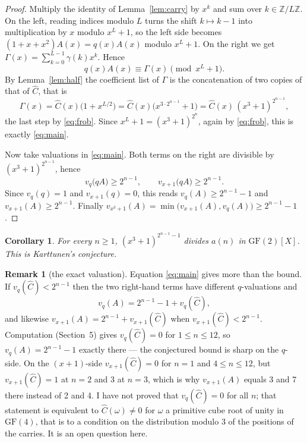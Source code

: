 \documentclass[11pt,a4paper]{article}
\theoremstyle{plain}
\newtheorem{corollary}[theorem]{Corollary}
\theoremstyle{definition}
\newtheorem*{remark}{Remark}
\newcommand{\Chat}{\widehat{C}}
\begin{document}
\begin{proof}
Multiply the identity of Lemma~\ref{lem:carry} by $x^{k}$ and sum over
$k\in\mathbb{Z}/L\mathbb{Z}$. On the left, reading indices modulo $L$ turns the shift
$k\mapsto k-1$ into multiplication by $x$ modulo $x^{L}+1$, so the left side becomes
$(1+x+x^{2})A(x)=q(x)A(x)$ modulo $x^{L}+1$. On the right we get
$\Gamma(x)=\sum_{k=0}^{L-1}\gamma(k)x^{k}$. Hence
\[
  q(x)A(x)\equiv\Gamma(x)\pmod{x^{L}+1}.
\]
By Lemma~\ref{lem:half} the coefficient list of $\Gamma$ is the concatenation of two copies
of that of $\Chat$, that is
\[
  \Gamma(x)=\Chat(x)\bigl(1+x^{L/2}\bigr)=\Chat(x)\bigl(x^{3\cdot2^{n-1}}+1\bigr)
  =\Chat(x)\,(x^{3}+1)^{2^{n-1}},
\]
the last step by \eqref{eq:frob}. Since $x^{L}+1=(x^{3}+1)^{2^{n}}$, again by
\eqref{eq:frob}, this is exactly \eqref{eq:main}.

Now take valuations in \eqref{eq:main}. Both terms on the right are divisible by
$(x^{3}+1)^{2^{n-1}}$, hence
\[
  v_{q}\bigl(qA\bigr)\ge2^{n-1},\qquad v_{x+1}\bigl(qA\bigr)\ge2^{n-1}.
\]
Since $v_{q}(q)=1$ and $v_{x+1}(q)=0$, this reads $v_{q}(A)\ge2^{n-1}-1$ and
$v_{x+1}(A)\ge2^{n-1}$. Finally
$v_{x^{3}+1}(A)=\min\bigl(v_{x+1}(A),v_{q}(A)\bigr)\ge2^{n-1}-1$.
\end{proof}

\begin{corollary}
For every $n\ge1$, $(x^{3}+1)^{2^{n-1}-1}$ divides $a(n)$ in $\mathrm{GF}(2)[X]$. This is
Karttunen's conjecture.
\end{corollary}

\begin{remark}[the exact valuation]
Equation \eqref{eq:main} gives more than the bound. If $v_{q}(\Chat)<2^{n-1}$ then the two
right-hand terms have different $q$-valuations and
\[
  v_{q}(A)=2^{n-1}-1+v_{q}(\Chat),
\]
and likewise $v_{x+1}(A)=2^{n-1}+v_{x+1}(\Chat)$ when $v_{x+1}(\Chat)<2^{n-1}$.
Computation (Section~5) gives $v_{q}(\Chat)=0$ for $1\le n\le12$, so $v_{q}(A)=2^{n-1}-1$
exactly there --- the conjectured bound is sharp on the $q$-side. On the $(x+1)$-side
$v_{x+1}(\Chat)=0$ for $n=1$ and $4\le n\le12$, but $v_{x+1}(\Chat)=1$ at $n=2$ and 3 at
$n=3$, which is why $v_{x+1}(A)$ equals 3 and 7 there instead of 2 and 4. I have not proved
that $v_{q}(\Chat)=0$ for all $n$; that statement is equivalent to $\Chat(\omega)\ne0$ for
$\omega$ a primitive cube root of unity in $\mathrm{GF}(4)$, that is to a condition on the
distribution modulo 3 of the positions of the carries. It is an open question here.
\end{remark}
\end{document}
